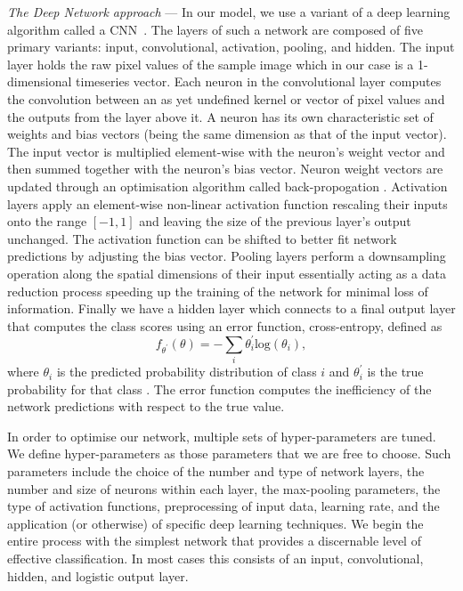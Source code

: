 \documentclass[%
 amsmath,amssymb,
 aps,
 twocolumn,
 prl,
 reprint,
floatfix,
]{revtex4-1}
\begin{document}
%
% 
\textit{The Deep Network approach} --- 
%
%
In our model, we use a variant of a deep learning algorithm called a
\ac{CNN}~\cite{726791}. The layers of such a network are composed of five
primary variants: input, convolutional, activation, pooling, and
hidden. The input layer holds the raw pixel values of the sample
image which in our case is a 1-dimensional timeseries vector.  Each neuron in
the convolutional layer computes the convolution between an as yet undefined
kernel or vector of pixel values and the outputs from the layer above it. A neuron has
its own characteristic set of weights and bias vectors (being the same dimension as that of the input vector). The input vector is multiplied element-wise with the neuron's weight vector and then summed together with the neuron's bias vector. Neuron weight vectors are updated through an optimisation algorithm called back-propogation \cite{LeCun1998}. 
Activation layers apply an element-wise non-linear activation function rescaling
their inputs onto the range $[-1,1]$ and leaving the size of the previous
layer's output unchanged. The activation function can be shifted to better fit network predictions by adjusting the bias vector. 
Pooling layers perform a downsampling operation along
the spatial dimensions of their input essentially acting as a data reduction
process speeding up the training of the network for minimal loss of
information. Finally we have a hidden layer which connects to a final output layer that
computes the class scores using an error function, cross-entropy, defined as
%
%
\begin{equation} \label{eq:loss}
f_{\theta^{'}}(\theta) = -\sum_{i} \theta_{i}^{'} \mathrm{log}(\theta_{i}),
\end{equation}
%
where $\theta_{i}$ is the predicted probability distribution of class $i$ and
$\theta_{i}^{'}$ is the true probability for that class
\cite{tensorflow2015-whitepaper}. The error function computes the inefficiency of
the network predictions with respect to the true value. 

%
%
In order to optimise our network, multiple sets of hyper-parameters are
tuned. We define hyper-parameters as those parameters that we are free to
choose. Such parameters include the choice of the number and type of network
layers, the number and size of neurons within each layer, the max-pooling
parameters, the type of activation functions, preprocessing of input data,
 learning rate, and the application (or otherwise) of specific deep learning techniques. We begin
the entire process with the simplest network that provides a discernable level
of effective classification. In most cases this consists of an input,
convolutional, hidden, and logistic output layer.
\end{document}
